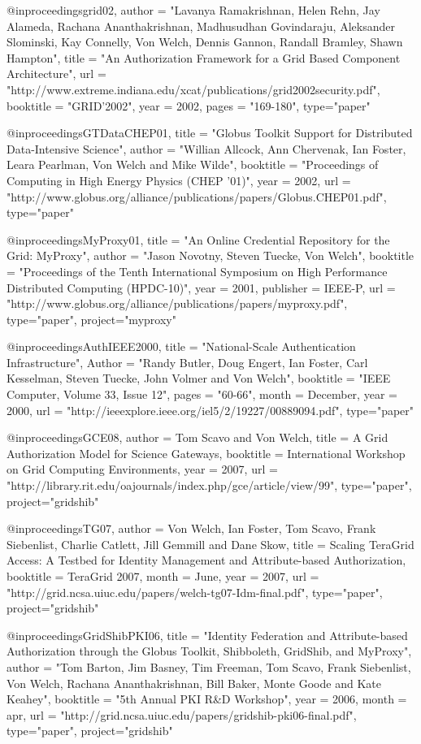 @inproceedings{grid02,
author = "Lavanya Ramakrishnan, Helen Rehn, Jay Alameda, Rachana Ananthakrishnan, Madhusudhan Govindaraju, Aleksander Slominski, Kay Connelly, Von Welch, Dennis Gannon, Randall Bramley, Shawn Hampton",
title = "An Authorization Framework for a Grid Based Component Architecture",
url = "http://www.extreme.indiana.edu/xcat/publications/grid2002security.pdf",
booktitle = "GRID'2002",
year = {2002},
pages = "169-180",
type="paper"
}

@inproceedings{GTDataCHEP01,
title	= "{G}lobus {T}oolkit Support for Distributed Data-Intensive Science",
author  = "Willian Allcock, Ann Chervenak, Ian Foster, Leara Pearlman, Von Welch and Mike Wilde",
booktitle = "Proceedings of Computing in High Energy Physics (CHEP '01)",
year = {2002},
url = "http://www.globus.org/alliance/publications/papers/Globus.CHEP01.pdf",
type="paper"
}


@inproceedings{MyProxy01,
title	= "{A}n {O}nline {C}redential {R}epository for the {G}rid: {MyProxy}",
author  = "Jason Novotny, Steven Tuecke, Von Welch",
booktitle = "Proceedings of the Tenth International Symposium on High Performance Distributed Computing (HPDC-10)",
year = {2001},
publisher = IEEE-P,	
url = "http://www.globus.org/alliance/publications/papers/myproxy.pdf",
type="paper",
project="myproxy"
}


@inproceedings{AuthIEEE2000,
title	= "National-Scale Authentication Infrastructure",
Author  = "Randy Butler, Doug Engert, Ian Foster, Carl Kesselman, Steven Tuecke, John Volmer and Von Welch",
booktitle = "IEEE Computer, Volume 33, Issue 12",
pages = "60-66",
month = {December},
year = {2000},
url = "http://ieeexplore.ieee.org/iel5/2/19227/00889094.pdf",
type="paper"
}

@inproceedings{GCE08,
author = {Tom Scavo and Von Welch},
title = {A Grid Authorization Model for Science Gateways},
booktitle = {International Workshop on Grid Computing Environments},
year = {2007},
url = "http://library.rit.edu/oajournals/index.php/gce/article/view/99",
type="paper",
project="gridshib"
}

@inproceedings{TG07,
author = {Von Welch, Ian Foster, Tom Scavo, Frank Siebenlist, Charlie Catlett, Jill Gemmill and Dane Skow},
title = {Scaling TeraGrid Access: A Testbed for Identity Management and Attribute-based Authorization},
booktitle = {TeraGrid 2007},
month = {June},
year = {2007},
url = "http://grid.ncsa.uiuc.edu/papers/welch-tg07-Idm-final.pdf",
type="paper",
project="gridshib"
}

@inproceedings{GridShibPKI06,
title   = "{I}dentity {F}ederation and {A}ttribute-based {A}uthorization through the {G}lobus {T}oolkit, {S}hibboleth, {G}ridShib, and {M}y{P}roxy",
author = "Tom Barton, Jim Basney, Tim Freeman, Tom Scavo, Frank Siebenlist, Von Welch, Rachana Ananthakrishnan, Bill Baker, Monte Goode and Kate Keahey",
booktitle = "5th Annual PKI R\&D Workshop",
year = {2006},
month = apr,
url = "http://grid.ncsa.uiuc.edu/papers/gridshib-pki06-final.pdf",
type="paper",
project="gridshib"
}

